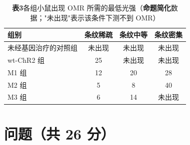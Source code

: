 \documentclass[UTF8,a4paper,11pt]{ctexart}
\newcommand{\key}[1]{\textbf{\color{deepred}#1}}
\begin{document}
\begin{table}[H]
\centering\small
\caption*{\textbf{表3}\quad 各组小鼠出现 OMR 所需的最低光强（\key{命题简化}数据；"未出现"表示该条件下测不到 OMR）}
\begin{tabular}{@{}lccc@{}}
\toprule
\textbf{组别} & \textbf{条纹稀疏} & \textbf{条纹中等} & \textbf{条纹密集} \\
\midrule
未经基因治疗的对照组 & 未出现 & 未出现 & 未出现 \\
wt-ChR2 组 & 25 & 未出现 & 未出现 \\
M1 组 & 12 & 20 & 28 \\
M2 组 & 5 & 8 & 40 \\
M3 组 & 6 & 14 & 未出现 \\
\bottomrule
\end{tabular}
\end{table}

\section{问题（共 26 分）}
\end{document}
